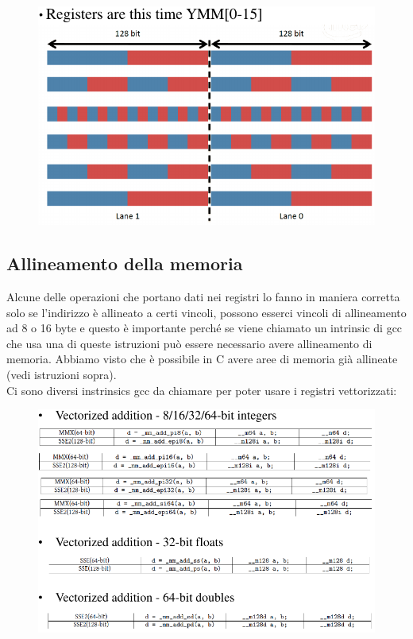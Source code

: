 \documentclass[12pt, oneside]{extbook}
\begin{document}
\begin{figure}[!h]
\includegraphics[scale=0.5]{immagini/sse_lanes.png}
\end{figure}
\subsection{Allineamento della memoria}
Alcune delle operazioni che portano dati nei registri lo fanno in maniera corretta solo se l'indirizzo è allineato a certi vincoli, possono esserci vincoli di allineamento ad 8 o 16 byte e questo è importante perché se viene chiamato un intrinsic di gcc che usa una di queste istruzioni può essere necessario avere allineamento di memoria. Abbiamo visto che è possibile in C avere aree di memoria già allineate (vedi istruzioni sopra).\\ Ci sono diversi instrinsics gcc da chiamare per poter usare i registri vettorizzati:
\begin{figure}[!h]
\includegraphics[scale=0.5]{immagini/sse_gcc_intrinsics.png}
\end{figure}
\end{document}
